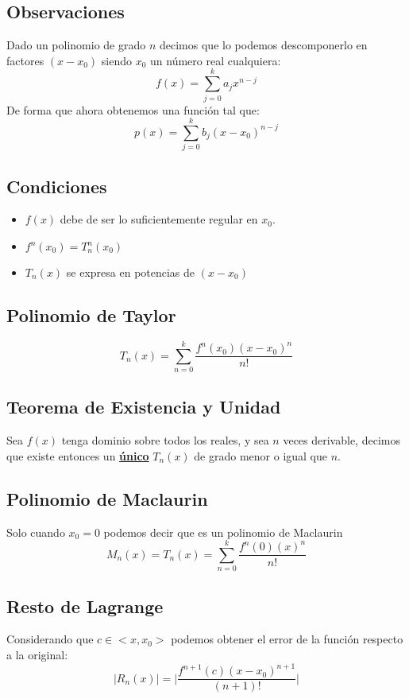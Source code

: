 \subsection{Observaciones}
\noindent Dado un polinomio de grado \(n\) decimos que lo podemos descomponerlo en factores \((x-x_0)\) siendo \(x_0\) un número real cualquiera:
\[
        f(x) = \sum^k_{j=0} a_jx^{n - j}
\]
\noindent De forma que ahora obtenemos una función tal que:
\[
        p(x) = \sum^k_{j=0} b_j(x-x_0)^{n - j}
\]
\subsection{Condiciones}
\begin{itemize}
        \item \(f(x)\) debe de ser lo suficientemente regular en \(x_0\).
        \item \(f^n(x_0) = T^n_n(x_0)\)
        \item \(T_n(x)\) se expresa en potencias de \((x-x_0)\)
\end{itemize}
\subsection{Polinomio de Taylor}
\[
        \boxed{T_n(x) = \sum^k_{n=0} \frac{f^n(x_0)(x-x_0)^n}{n!}}
\]
\subsection{Teorema de Existencia y Unidad}
\noindent Sea \(f(x)\) tenga dominio sobre todos los reales, y sea \(n\) veces derivable, decimos que existe entonces un \underline{\textbf{único}} \(T_n(x)\) de grado menor o igual que \(n\).
\subsection{Polinomio de Maclaurin}
\noindent Solo cuando \(x_0 = 0\) podemos decir que es un polinomio de Maclaurin
\[
        \boxed{M_n(x) = T_n(x) = \sum^k_{n=0} \frac{f^n(0)(x)^n}{n!}}
\]
\subsection{Resto de Lagrange}
\noindent Considerando que \(c \in <x,x_0>\) podemos obtener el error de la función respecto a la original:
\[
        \boxed{\left | R_n(x) \right | = \Big | \frac{f^{n+1}(c) (x-x_0)^{n+1}}{(n+1)!}\Big |}
\]